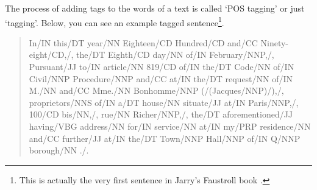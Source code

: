 The process of adding tags to the words of a text is called `\ac{POS} tagging' or just `tagging'. Below, you can see an example tagged sentence\footnote{This is actually the very first sentence in Jarry's Faustroll book \autocite*{Jarry1996}.}.

\begin{quote}
  In\slash{}IN this\slash{}DT year\slash{}NN Eighteen\slash{}CD Hundred\slash{}CD and\slash{}CC Ninety-eight\slash{}CD,\slash{}, the\slash{}DT Eighth\slash{}CD day\slash{}NN of\slash{}IN February\slash{}NNP,\slash{}, Pursuant\slash{}JJ to\slash{}IN article\slash{}NN 819\slash{}CD of\slash{}IN the\slash{}DT Code\slash{}NN of\slash{}IN Civil\slash{}NNP Procedure\slash{}NNP and\slash{}CC at\slash{}IN the\slash{}DT request\slash{}NN of\slash{}IN M.\slash{}NN and\slash{}CC Mme.\slash{}NN Bonhomme\slash{}NNP (\slash{}(Jacques\slash{}NNP)\slash{}),\slash{}, proprietors\slash{}NNS of\slash{}IN a\slash{}DT house\slash{}NN situate\slash{}JJ at\slash{}IN Paris\slash{}NNP,\slash{}, 100\slash{}CD bis\slash{}NN,\slash{}, rue\slash{}NN Richer\slash{}NNP,\slash{}, the\slash{}DT aforementioned\slash{}JJ having\slash{}VBG address\slash{}NN for\slash{}IN service\slash{}NN at\slash{}IN my\slash{}PRP residence\slash{}NN and\slash{}CC further\slash{}JJ at\slash{}IN the\slash{}DT Town\slash{}NNP Hall\slash{}NNP of\slash{}IN Q\slash{}NNP borough\slash{}NN .\slash{}.
\end{quote}






